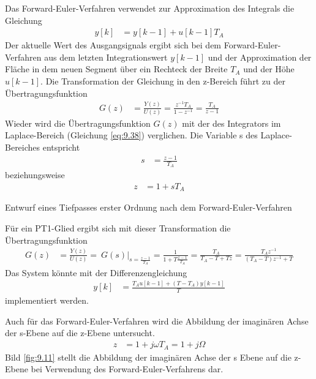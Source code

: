 Das Forward-Euler-Verfahren verwendet zur Approximation des Integrals die Gleichung
\begin{align}
y[ k] &= y[ k - 1] + u[ k - 1]  T_{A} \label{eq:9.48}
\end{align}
Der aktuelle Wert des Ausgangsignals ergibt sich bei dem Forward-Euler-Verfahren aus dem letzten Integrationswert \(y[k - 1]\) und der Approximation der Fläche in dem neuen Segment über ein Rechteck der Breite \(T_{A}\) und der Höhe \(u[k - 1]\). Die Transformation der Gleichung in den z-Bereich führt zu der Übertragungsfunktion
\begin{align}
G(z) &= \frac{Y(z)}{U(z)} = \frac{z^{- 1}  T_{A}}{1 - z^{- 1}} = \frac{T_{A}}{z - 1} \label{eq:9.49}
\end{align}
Wieder wird die Übertragungsfunktion \(G(z)\) mit der des Integrators im Laplace-Bereich (Gleichung \eqref{eq:9.38}) verglichen. Die Variable s des Laplace-Bereiches entspricht
\begin{align}
s &= \frac{z - 1}{T_{A}} \label{eq:9.50}
\end{align}
beziehungsweise
\begin{align}
z &= 1 + s  T_{A} \label{eq:9.51}
\end{align}
\begin{example}{Entwurf eines Tiefpasses erster Ordnung nach dem Forward-Euler-Verfahren}
\label{example:beispiel-entwurf-eines-tiefpasses-erster-ordnung-nach-dem-forward-euler-verfahren}

Für ein PT1-Glied ergibt sich mit dieser Transformation die Übertragungsfunktion
\begin{align*}
G(z) &= \frac{Y(z)}{U(z)} = \left. \ G(s) \right|_{s = \frac{z - 1}{T_{A}}} = \frac{1}{1 + T  \frac{z - 1}{T_{A}}} = \frac{T_{A}}{T_{A} - T + T  z} = \frac{T_{A}  z^{- 1}}{\left( T_{A} - T \right)  z^{- 1} + T} 
\end{align*}
Das System könnte mit der Differenzengleichung
\begin{align*}
y[ k] &= \frac{T_{A}  u[ k - 1] + \left( T - T_{A} \right)  y[ k - 1]}{T} 
\end{align*}
implementiert werden.

\end{example}

Auch für das Forward-Euler-Verfahren wird die Abbildung der imaginären Achse der s-Ebene auf die z-Ebene untersucht.
\begin{align}
z &= 1 + j  \omega  T_{A} = 1 + j  \Omega \label{eq:9.54}
\end{align}
Bild \ref{fig:9.11} stellt die Abbildung der imaginären Achse der s Ebene auf die z-Ebene bei Verwendung des Forward-Euler-Verfahrens dar.

